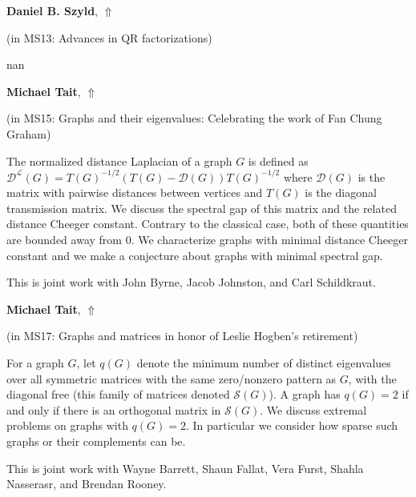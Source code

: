 \documentclass[ILAS2025-program.tex]{subfiles}
\begin{document}
\hypertarget{down0339}{}\begin{ilasabstract}
    
\textbf{Daniel B. Szyld},  \hfill \hyperlink{up0339}{$\Uparrow$}
    
    
(in {\color{mstitle}MS13: Advances in QR factorizations})
        
\mtskip
    nan
\end{ilasabstract}
    

\hypertarget{down0061}{}\begin{ilasabstract}
    
\textbf{Michael Tait},  \hfill \hyperlink{up0061}{$\Uparrow$}
    
    
(in {\color{mstitle}MS15: Graphs and their eigenvalues: Celebrating the work of Fan Chung Graham})
        
\mtskip
    The normalized distance Laplacian of a graph $G$ is defined as $\mathcal{D}^\mathcal{L}(G)=T(G)^{-1/2}(T(G)-\mathcal{D}(G))T(G)^{-1/2}$ where $\mathcal{D}(G)$ is the matrix with pairwise distances between vertices and $T(G)$ is the diagonal transmission matrix. We discuss the spectral gap of this matrix and the related distance Cheeger constant. Contrary to the classical case, both of these quantities are bounded away from $0$. We characterize graphs with minimal distance Cheeger constant and we make a conjecture about graphs with minimal spectral gap. 
 
This is joint work with John Byrne, Jacob Johnston, and Carl Schildkraut.
\end{ilasabstract}
    

\hypertarget{down0178}{}\begin{ilasabstract}
    
\textbf{Michael Tait},  \hfill \hyperlink{up0178}{$\Uparrow$}
    
    
(in {\color{mstitle}MS17: Graphs and matrices in honor of Leslie Hogben's retirement})
        
\mtskip
    For a graph $G$, let $q(G)$ denote the minimum number of distinct eigenvalues over all symmetric matrices with the same zero/nonzero pattern as $G$, with the diagonal free (this family of matrices denoted $\mathcal{S}(G)$). A graph has $q(G) = 2$ if and only if there is an orthogonal matrix in $\mathcal{S}(G)$. We discuss extremal problems on graphs with $q(G)=2$. In particular we consider how sparse such graphs or their complements can be.

This is joint work with Wayne Barrett, Shaun Fallat, Vera Furst, Shahla Nasserasr, and Brendan Rooney.


\end{ilasabstract}
    
\end{document}
